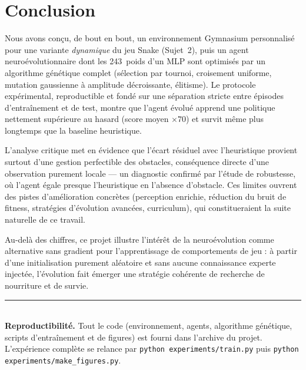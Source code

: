 \documentclass[11pt,a4paper]{article}
\begin{document}
\section{Conclusion}

Nous avons conçu, de bout en bout, un environnement Gymnasium personnalisé pour
une variante \emph{dynamique} du jeu Snake (Sujet~2), puis un agent
neuroévolutionnaire dont les 243~poids d'un MLP sont optimisés par un algorithme
génétique complet (sélection par tournoi, croisement uniforme, mutation gaussienne
à amplitude décroissante, élitisme). Le protocole expérimental, reproductible et
fondé sur une séparation stricte entre épisodes d'entraînement et de test, montre
que l'agent évolué apprend une politique nettement supérieure au hasard (score
moyen $\times 70$) et survit même plus longtemps que la baseline heuristique.

L'analyse critique met en évidence que l'écart résiduel avec l'heuristique provient
surtout d'une gestion perfectible des obstacles, conséquence directe d'une
observation purement locale --- un diagnostic confirmé par l'étude de robustesse,
où l'agent égale presque l'heuristique en l'absence d'obstacle. Ces limites
ouvrent des pistes d'amélioration concrètes (perception enrichie, réduction du
bruit de fitness, stratégies d'évolution avancées, curriculum), qui constitueraient
la suite naturelle de ce travail.

Au-delà des chiffres, ce projet illustre l'intérêt de la neuroévolution comme
alternative sans gradient pour l'apprentissage de comportements de jeu : à partir
d'une initialisation purement aléatoire et sans aucune connaissance experte
injectée, l'évolution fait émerger une stratégie cohérente de recherche de
nourriture et de survie.

\vspace{1cm}
\noindent\rule{\linewidth}{0.4pt}\\
{\footnotesize \textbf{Reproductibilité.} Tout le code (environnement, agents,
algorithme génétique, scripts d'entraînement et de figures) est fourni dans
l'archive du projet. L'expérience complète se relance par
\texttt{python experiments/train.py} puis \texttt{python experiments/make\_figures.py}.}
\end{document}
